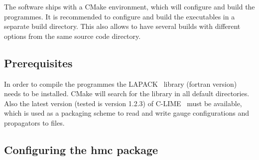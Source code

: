 The software ships with a CMake environment, which will configure and build the
programmes. It is recommended to configure and build the executables in a
separate build directory. This also allows to have several builds with different
options from the same source code directory.

\subsection{Prerequisites}

In order to compile the programmes the {\ttfamily LAPACK}~\cite{lapack:web}
library (fortran version) needs to be installed. CMake will search for the
library in all default directories. Also the latest version (tested is version
1.2.3) of {\ttfamily C-LIME}~\cite{lime:web} must be available, which is used as
a packaging scheme to read and write gauge configurations and propagators to
files.

\subsection{Configuring the hmc package}
\label{sec:config}

